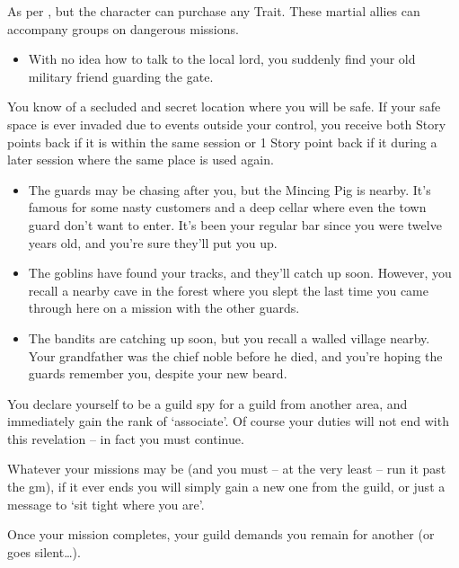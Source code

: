 \begin{multicols}{2}
As per , but the character can purchase any Trait.
These martial allies can accompany groups on dangerous missions.

\begin{itemize}
  \item
  With no idea how to talk to the local lord, you suddenly find your old military friend guarding the gate.
\end{itemize}

You know of a secluded and secret location where you will be safe.
If your safe space is ever invaded due to events outside your control, you receive both Story points back if it is within the same session or 1 Story point back if it during a later session where the same place is used again.

\begin{itemize}
  \item
  The guards may be chasing after you, but the Mincing Pig is nearby.  It's famous for some nasty customers and a deep cellar where even the town guard don't want to enter.
  It's been your regular bar since you were twelve years old, and you're sure they'll put you up.
  \item
  The goblins have found your tracks, and they'll catch up soon.
  However, you recall a nearby cave in the forest where you slept the last time you came through here on a mission with the other guards.
  \item
  The bandits are catching up soon, but you recall a walled village nearby.
Your grandfather was the chief noble before he died, and you're hoping the guards remember you, despite your new beard.
\end{itemize}

You declare yourself to be a guild spy for a guild from another area, and immediately gain the rank of `associate'.%
Of course your  duties will not end with this revelation -- in fact you must continue.

Whatever your missions may be (and you must -- at the very least -- run it past the \gls{gm}), if it ever ends you will simply gain a new one from the guild, or just a message to `sit tight where you are'.

Once your mission completes, your guild demands you remain for another (or goes silent\ldots).

\begin{itemize}


\end{itemize}
\end{multicols}
